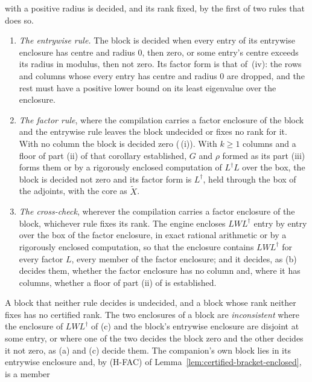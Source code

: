 \begin{requirement}
\begin{enumerate}[label=(\roman*),leftmargin=2.4em]
  with a positive radius is decided, and its rank fixed, by the first of
  two rules that does so.
  \begin{enumerate}[label=(\alph*),leftmargin=2.2em]
  \item \emph{The entrywise rule.} The block is decided when every entry of
    its entrywise enclosure has centre and radius $0$, then zero, or some
    entry's centre exceeds its radius in modulus, then not zero. Its factor
    form is that of
    \,(iv): the rows
    and columns whose every entry has centre and radius $0$ are dropped, and
    the rest must have a positive lower bound on its least eigenvalue over
    the enclosure.
  \item \emph{The factor rule}, where the compilation carries a factor
    enclosure of the block and the entrywise rule leaves the block
    undecided or fixes no rank for it. With no column the block is decided
    zero (\,(i)). With
    $k\ge1$ columns and a floor of part (ii) of that corollary established,
    $G$ and $\rho$ formed as its part (iii) forms them or by a rigorously
    enclosed computation of $L^{\dagger}L$ over the box, the block is
    decided not zero and its factor form is $L^{\dagger}$, held through the
    box of the adjoints, with the core as $\widetilde X$.
  \item \emph{The cross-check}, wherever the compilation carries a factor
    enclosure of the block, whichever rule fixes its rank. The engine
    encloses $LWL^{\dagger}$ entry by entry over the box of the factor
    enclosure, in exact rational arithmetic or by a rigorously enclosed
    computation, so that the enclosure contains $LWL^{\dagger}$ for every
    factor $L$, every member of the factor enclosure; and it decides, as (b)
    decides them, whether the factor enclosure has no column and, where it
    has columns, whether a floor of part (ii) of
     is established.
  \end{enumerate}
  A block that neither rule decides is undecided, and a block whose rank
  neither fixes has no certified rank. The two enclosures of a block are
  \emph{inconsistent} where the enclosure of $LWL^{\dagger}$ of (c) and the
  block's entrywise enclosure are disjoint at some entry, or where one of the
  two decides the block zero and the other decides it not zero, as (a) and
  (c) decide them. The companion's own block lies in its entrywise enclosure
  and, by (H-FAC) of Lemma~\ref{lem:certified-bracket-enclosed}, is a member

\end{enumerate}
\end{requirement}

